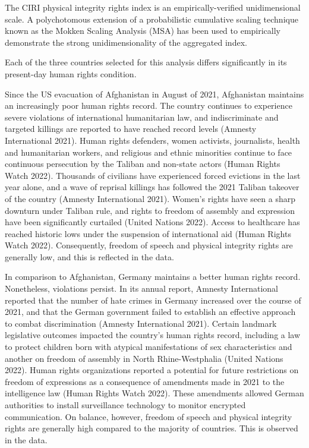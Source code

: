 \documentclass{article}
\begin{document}
The CIRI physical integrity rights index is an empirically-verified unidimensional scale. A polychotomous extension of a probabilistic cumulative scaling technique known as the Mokken Scaling Analysis (MSA) has been used to empirically demonstrate the strong unidimensionality of the aggregated index.

Each of the three countries selected for this analysis differs significantly in its present-day human rights condition.

Since the US evacuation of Afghanistan in August of 2021, Afghanistan maintains an increasingly poor human rights record. The country continues to experience severe violations of international humanitarian law, and indiscriminate and targeted killings are reported to have reached record levels (Amnesty International 2021). Human rights defenders, women activists, journalists, health and humanitarian workers, and religious and ethnic minorities continue to face continuous persecution by the Taliban and non-state actors (Human Rights Watch 2022). Thousands of civilians have experienced forced evictions in the last year alone, and a wave of reprisal killings has followed the 2021 Taliban takeover of the country (Amnesty International 2021). Women's rights have seen a sharp downturn under Taliban rule, and rights to freedom of assembly and expression have been significantly curtailed (United Nations 2022). Access to healthcare has reached historic lows under the suspension of international aid (Human Rights Watch 2022). Consequently, freedom of speech and physical integrity rights are generally low, and this is reflected in the data.

In comparison to Afghanistan, Germany maintains a better human rights record. Nonetheless, violations persist. In its annual report, Amnesty International reported that the number of hate crimes in Germany increased over the course of 2021, and that the German government failed to establish an effective approach to combat discrimination (Amnesty International 2021). Certain landmark legislative outcomes impacted the country's human rights record, including a law to protect children born with atypical manifestations of sex characteristics and another on freedom of assembly in North Rhine-Westphalia (United Nations 2022). Human rights organizations reported a potential for future restrictions on freedom of expressions as a consequence of amendments made in 2021 to the intelligence law (Human Rights Watch 2022). These amendments allowed German authorities to install surveillance technology to monitor encrypted communication. On balance, however, freedom of speech and physical integrity rights are generally high compared to the majority of countries. This is observed in the data.
\end{document}
